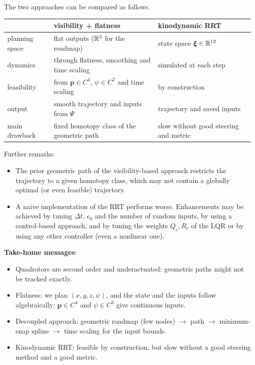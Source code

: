 \documentclass[10pt, a4paper]{report}
\begin{document}
\noindent The two approaches can be compared as follows.
\begin{table}[H]
    \centering
    \renewcommand{\arraystretch}{1.6}
    \begin{tabular}{p{}p{}p{}}
        \toprule
        & \textsf{\textbf{visibility + flatness}} & \textsf{\textbf{kinodynamic RRT}} \\
        \midrule
        planning space & flat outputs (${\mathbb R}^3$ for the roadmap) & state space ${\boldsymbol{\xi}}\in{\mathbb R}^{12}$ \\
        dynamics & through flatness, smoothing and time scaling & simulated at each step \\
        feasibility & from $\mathbf p\in C^4$, $\psi\in C^2$ and time scaling & by construction \\
        output & smooth trajectory and inputs from $\Psi$ & trajectory and saved inputs \\
        main drawback & fixed homotopy class of the geometric path & slow without good steering and metric \\
        \bottomrule
    \end{tabular}
\end{table}
\noindent Further remarks:\begin{itemize}
    \item The prior geometric path of the visibility-based approach restricts the trajectory to a given homotopy class, which may not contain a globally optimal (or even feasible) trajectory.
    \item A naive implementation of the RRT performs worse. Enhancements may be achieved by tuning $\Delta t$, $\epsilon_0$ and the number of random inputs, by using a control-based approach, and by tuning the weights $Q_c,R_c$ of the LQR or by using any other controller (even a nonlinear one).
\end{itemize}
\noindent \textbf{Take-home messages}:\begin{itemize}
    \item Quadrotors are second order and underactuated: geometric paths might not be tracked exactly.
    \item Flatness: we plan $(x,y,z,\psi)$, and the state and the inputs follow algebraically; $\mathbf p\in C^4$ and $\psi\in C^2$ give continuous inputs.
    \item Decoupled approach: geometric roadmap (few nodes) $\to$ path $\to$ minimum-snap spline $\to$ time scaling for the input bounds.
    \item Kinodynamic RRT: feasible by construction, but slow without a good steering method and a good metric.
\end{itemize}
\end{document}
